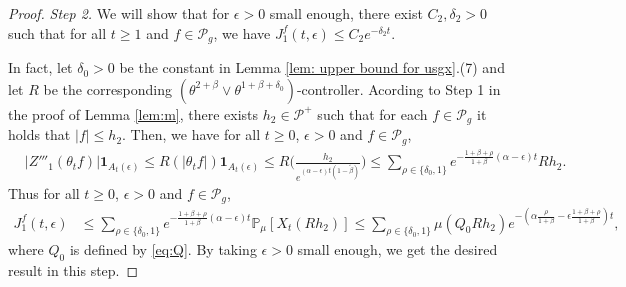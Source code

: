 \documentclass[12pt,a4paper]{amsart}
\theoremstyle{plain}
\theoremstyle{definition}
\numberwithin{equation}{section}
\begin{document}
\begin{proof}
\emph{Step 2.} We will show that for $\epsilon>0$ small enough, there exist  $C_2, \delta_2>0$ such that for all $t\geq 1$ and
$f \in \mathcal P_g$, we have $ J^f_1(t,\epsilon) \leq C_2e^{-\delta_2 t}$.

In fact, let $\delta_0 >0$ be the constant in Lemma \ref{lem: upper bound for usgx}.(7) and let $R$ be the corresponding $(\theta^{2+\beta}\vee \theta^{1+\beta+\delta_0})$-controller.
Acording to Step 1 in the proof of Lemma \ref{lem:m}, there exists $h_{2} \in \mathcal P^+$ such that for each $f \in \mathcal P_g$ it holds that $|f| \leq h_{2}$.
Then, we have for all $t\geq 0$, $\epsilon> 0$ and $f\in \mathcal P_g$,
\begin{align}
  & |Z'''_1(\theta_t f)|\mathbf{1}_{A_{t}(\epsilon)}
    \leq R(|\theta_{t} f|)\mathbf{1}_{A_{t}(\epsilon)}
    \leq R \Big(\frac{h_{2}}{e^{(\alpha-\epsilon)t(1-\tilde \beta)}}\Big)
    \leq \sum_{\rho \in \{\delta_0,1\}}e^{-\frac{1+\beta+\rho}{1+\beta}(\alpha-\epsilon)t}Rh_{2}.
\end{align}
Thus for all $t\geq 0$, $\epsilon> 0$ and $f\in \mathcal P_g$,
\begin{align}
  \label{eq: estimate of J1}
  J^f_1(t,\epsilon)
& \leq \sum_{\rho \in \{\delta_0,1\}}e^{-\frac{1+\beta+\rho}{1+\beta}(\alpha-\epsilon)t}\mathbb{P}_{\mu}[X_{t}(Rh_2)]
  \leq \sum_{\rho \in \{\delta_0,1\}} \mu(Q_0 R h_{2}) e^{-(\alpha\frac{\rho}{1+\beta}-\epsilon\frac{1+\beta+\rho}{1+\beta})t},
\end{align}
where $Q_0$ is defined by \eqref{eq:Q}.
By taking $\epsilon>0$ small enough, we get the desired result in this step.


\end{proof}
\end{document}
